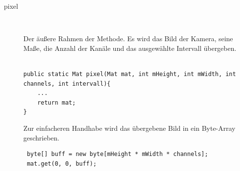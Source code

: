 \begin{description}
\item[pixel]~\par
\label{pixel}
Der äußere Rahmen der Methode. Es wird das Bild der Kamera, seine Maße, die Anzahl der Kanäle und das ausgewählte Intervall übergeben.
\\\
\begin{lstlisting}
public static Mat pixel(Mat mat, int mHeight, int mWidth, int channels, int intervall){ 
	...
	return mat;
} 
\end{lstlisting}

Zur einfacheren Handhabe wird das übergebene Bild in ein Byte-Array geschrieben.
\begin{lstlisting}
 byte[] buff = new byte[mHeight * mWidth * channels];
 mat.get(0, 0, buff);
\end{lstlisting}


\end{description}
